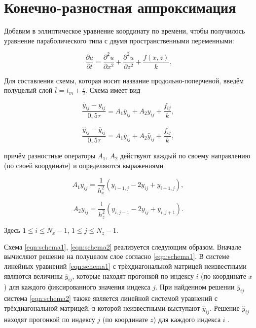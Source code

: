 \documentclass[12pt, a4paper]{article}
\begin{document}
\section{Конечно-разностная аппроксимация}

Добавим в эллиптическое уравнение координату по времени, чтобы получилось уравнение параболического типа с двумя пространственными переменными:

\begin{equation}
	\frac{\partial u}{\partial t} = \frac{\partial^2 u}{\partial x^2} + \frac{\partial^2 u}{\partial z^2} + \frac{f(x, z)}{k}.
\end{equation}

Для составления схемы, которая носит название продольно-поперченой, введём полуцелый слой $\overline{t} = t_m + \frac\tau2$.
Схема имеет вид

\begin{equation}
	\label{eqn:schema1}
	\frac{\overline y_{ij} - y_{ij}}{0,5\tau} = A_1\overline y_{ij} + A_2y_{ij} + \frac{f_{ij}}k,
\end{equation}

\begin{equation}
	\label{eqn:schema2}
	\frac{\hat y_{ij} - \overline y_{ij}}{0,5\tau} = A_1\overline y_{ij} + A_2\hat y_{ij} + \frac{f_{ij}}k,
\end{equation}

\noindent причём разностные операторы $A_1$, $A_2$ действуют каждый по своему направлению (по своей координате) и определяются выражениями

\begin{equation}
	A_1 y_{ij} = \frac{1}{h_x^2} (y_{i - 1, j} - 2y_{ij} + y_{i + 1, j}),
\end{equation}

\begin{equation}
	A_2 y_{ij} = \frac{1}{h_z^2} (y_{i, j - 1} - 2y_{ij} + y_{i, j + 1}).
\end{equation}

Здесь $1 \leqslant i \leqslant N_x - 1$, $1 \leqslant j \leqslant N_z - 1$.

Схема \eqref{eqn:schema1}, \eqref{eqn:schema2} реализуется следующим образом.
Вначале вычисляют решение на полуцелом слое согласно \eqref{eqn:schema1}.
В системе линейных уравнений \eqref{eqn:schema1} с трёхдиагональной матрицей неизвестными являются величины $\overline y_{ij}$, которые находят прогонкой по индексу $i$ (по координате $x$) для каждого фиксированного значения индекса $j$.
При найденном решении $\overline y_{ij}$ система \eqref{eqn:schema2} также является линейной системой уравнений с трёхдиагональной матрицей, в которой неизвестными выступают $\hat y_{ij}$.
Решение $\hat y_{ij}$ находят прогонкой по индексу $j$ (по координате $z$) для каждого индекса $i$ \cite{1}.
\end{document}
